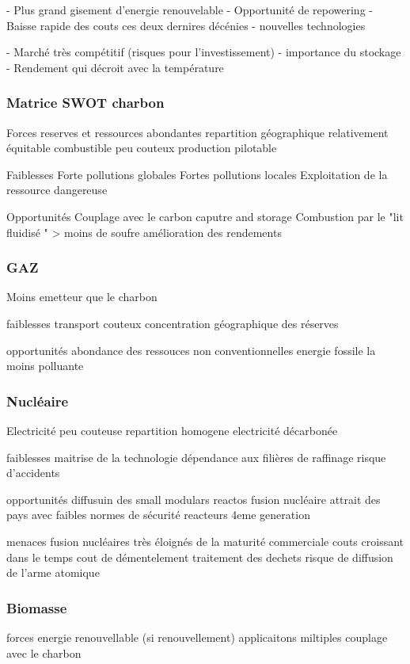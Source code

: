 \documentclass{article}
\begin{document}
	
	- Plus grand gisement d'energie renouvelable
	- Opportunité de repowering
	- Baisse rapide des couts ces deux dernires décénies
	- nouvelles technologies
	
	- Marché très compétitif (risques pour l'investissement)
	- importance du stockage
	- Rendement qui décroit avec la température	


\subsubsection{Matrice SWOT charbon}
Forces
reserves et ressources abondantes
repartition géographique relativement équitable
combustible peu couteux
production pilotable

Faiblesses
Forte pollutions globales
Fortes pollutions locales
Exploitation de la ressource dangereuse

Opportunités
Couplage avec le carbon caputre and storage
Combustion par le "lit fluidisé " > moins de soufre
amélioration des rendements

\subsubsection{GAZ}
Moins emetteur que le charbon

faiblesses
transport couteux
concentration géographique des réserves

opportunités 
abondance des ressouces non conventionnelles
energie fossile la moins polluante


\subsubsection{Nucléaire}
Electricité peu couteuse
repartition homogene
electricité décarbonée 

faiblesses
maitrise de la technologie
dépendance aux filières de raffinage
risque d'accidents 

opportunités
diffusuin des small modulars reactos
fusion nucléaire
attrait des pays avec faibles normes de sécurité
reacteurs 4eme generation

menaces
fusion nucléaires très éloignés de la maturité commerciale
couts croissant dans le temps
cout de démentelement
traitement des dechets
risque de diffusion de l'arme atomique

\subsubsection{Biomasse}
forces 
energie renouvellable (si renouvellement)
applicaitons miltiples
couplage avec le charbon
\end{document}

